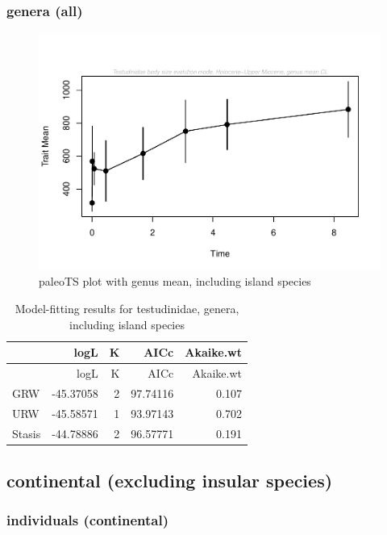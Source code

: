 \documentclass[]{article}
\begin{document}
\newpage

\subsubsection{genera (all)}\label{genera-all}

\begin{figure}[htbp]
\centering
\includegraphics{MA_JJ_files/figure-latex/paleoTS plot with genus mean, including island species-1.pdf}
\caption{paleoTS plot with genus mean, including island species}
\end{figure}

\begin{longtable}[]{@{}lrrrr@{}}
\caption{Model-fitting results for testudinidae, genera, including
island species}\tabularnewline
\toprule
& logL & K & AICc & Akaike.wt\tabularnewline
\midrule
\endfirsthead
\toprule
& logL & K & AICc & Akaike.wt\tabularnewline
\midrule
\endhead
GRW & -45.37058 & 2 & 97.74116 & 0.107\tabularnewline
URW & -45.58571 & 1 & 93.97143 & 0.702\tabularnewline
Stasis & -44.78886 & 2 & 96.57771 & 0.191\tabularnewline
\bottomrule
\end{longtable}

\newpage

\subsection{continental (excluding insular
species)}\label{continental-excluding-insular-species}

\subsubsection{individuals (continental)}\label{individuals-continental}
\end{document}
